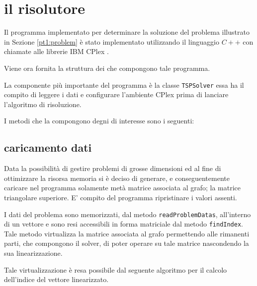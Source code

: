 %
%
\section[Il risolutore]{il risolutore}
\label{pt1:solver}
Il programma implementato per determinare la soluzione del problema illustrato in Sezione \ref{pt1:problem} è stato implementato utilizzando il linguaggio $C++$ con chiamate alle librerie IBM CPlex .

Viene ora fornita la struttura dei  che compongono tale programma.


La componente più importante del programma è la classe \texttt{TSPSolver} essa ha il compito di leggere i dati e configurare l'ambiente CPlex prima di lanciare l'algoritmo di risoluzione.

I metodi che la compongono degni di interesse sono i seguenti:


\subsection[Caricamento dati]{caricamento dati}
\label{pt1:solver:datas}
Data la possibilità di gestire problemi di grosse dimensioni ed al fine di ottimizzare la risorsa memoria si è deciso di generare, e conseguentemente caricare nel programma  solamente metà matrice associata al grafo; la matrice triangolare superiore. E' compito del programma ripristinare i valori assenti.

I dati del problema sono memorizzati, dal metodo \texttt{readProblemDatas}, all'interno di un vettore e sono resi accessibili in forma matriciale dal metodo \texttt{findIndex}. Tale metodo virtualizza la matrice associata al grafo permettendo alle rimanenti parti, che compongono il solver, di poter operare su tale matrice nascondendo la sua linearizzazione.

Tale virtualizzazione è resa possibile dal seguente algoritmo per il calcolo dell'indice del vettore linearizzato.

